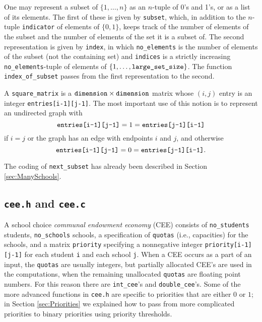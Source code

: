 \documentclass[12pt]{article}
\theoremstyle{definition}
\begin{document}
\begin{appendix}
One may represent a subset of $\{1, \ldots, n\}$ as an $n$-tuple of
0's and 1's, or as a list of its elements.  The first of these is
given by \texttt{subset}, which, in addition to the $n$-tuple
\texttt{indicator} of elements of $\{0,1\}$, keeps track of the number
of elements of the subset and the number of elements of the set it is
a subset of.  The second representation is given by \texttt{index}, in
which \texttt{no\_elements} is the number of elements of the subset
(not the containing set) and \texttt{indices} is a strictly increasing
\texttt{no\_elements}-tuple of elements of $\{1, \ldots,
\text{\texttt{large\_set\_size}}\}$.  The function
\texttt{index\_of\_subset} passes from the first representation to the
second.

A \texttt{square\_matrix} is a $\text{\texttt{dimension}} \times
\texttt{dimension}$ matrix whose $(i,j)$ entry is an integer
\texttt{entries[i-1][j-1]}.  The most important use of this notion is
to represent an undirected graph with
$$\text{\texttt{entries[i-1][j-1]}} = 1 =
\text{\texttt{entries[j-1][i-1]}}$$ if $i = j$ or the graph has an
edge with endpoints $i$ and $j$, and otherwise
$$\text{\texttt{entries[i-1][j-1]}} = 0 =
\text{\texttt{entries[j-1][i-1]}}.$$

The coding of \texttt{next\_subset} has already been described in Section \ref{sec:ManySchools}.

\subsection{\texttt{cee.h} and \texttt{cee.c}}

A school choice \emph{communal endowment economy} (CEE) consists of
\texttt{no\_students} students, \texttt{no\_schools} schools, a
specification of \texttt{quotas} (i.e., capacities) for the schools,
and a matrix \texttt{priority} specifying a nonnegative integer
\texttt{priority[i-1][j-1]} for each student \texttt{i} and each
school \texttt{j}.  When a CEE occurs as a part of an input, the
\texttt{quotas} are usually integers, but partially allocated CEE's
are used in the computations, when the remaining unallocated
\texttt{quotas} are floating point numbers.  For this reason there are
\texttt{int\_cee}'s and \texttt{double\_cee}'s.  Some of the more
advanced functions in \texttt{cee.h} are specific to priorities that
are either $0$ or $1$; in Section \ref{sec:Priorities} we explained
how to pass from more complicated priorities to binary priorities
using priority thresholds.


\end{appendix}
\end{document}
